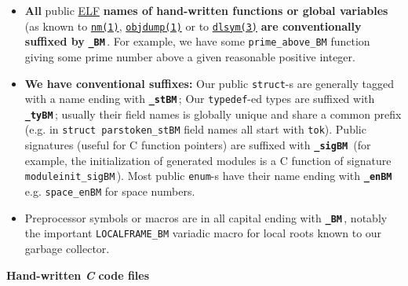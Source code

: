 \begin{itemize}

  \item \textbf{All} public
    \href{https://en.wikipedia.org/wiki/Executable_and_Linkable_Format}{ELF}
    \textbf{names of hand-written functions or global variables} (as
    known to
    \href{https://man7.org/linux/man-pages/man1/nm.1.html}{\texttt{nm(1)}},
    \href{https://man7.org/linux/man-pages/man1/objdump.1.html}{\texttt{objdump(1)}}
    or to
    \href{https://man7.org/linux/man-pages/man3/dlsym.3.html}{\texttt{dlsym(3)}}
    \textbf{are conventionally suffixed by}
           {\texttt{\textbf{\_BM}}}\,. For example, we have some
           \texttt{prime\_above\_BM} function giving some prime number
           above a given reasonable positive integer.

         \item \textbf{We have conventional suffixes:} Our public
            \texttt{struct}-s are generally tagged
           with a name ending with {\texttt{\textbf{\_stBM}}}\,; Our
           \texttt{typedef}-ed types are suffixed with
                  {\texttt{\textbf{\_tyBM}}}\,; usually their field
                  names is globally unique and share a common prefix
                  (e.g. in \texttt{struct parstoken\_stBM} field names
                  all start with \texttt{tok}). Public signatures
                  (useful for C function pointers) are suffixed with
                  {\texttt{\textbf{\_sigBM}}}\, (for example, the
                  initialization of generated modules is a C function
                  of signature \texttt{moduleinit\_sigBM}\,). Most
                  public \texttt{enum}-s have their name ending with
                  {\texttt{\textbf{\_enBM}}}\,
                  e.g. \texttt{space\_enBM} for space numbers.

              \item Preprocessor symbols or macros are in all capital
                ending with {\texttt{\textbf{\_BM}}}\,, notably the
                important \texttt{LOCALFRAME\_BM} variadic macro for
                local roots known to our garbage collector.
\end{itemize}

{\large \textbf{Hand-written \emph{C} code files}}

